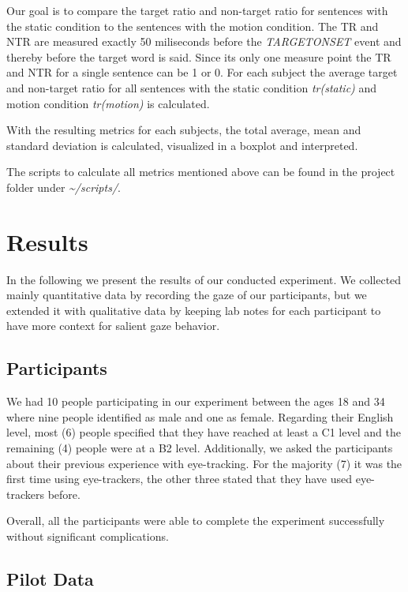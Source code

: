 \documentclass[
  12pt,
  letterpaper,
  DIV=11,
  numbers=noendperiod]{scrreprt}
\begin{document}
Our goal is to compare the target ratio and non-target ratio for
sentences with the static condition to the sentences with the motion
condition. The TR and NTR are measured exactly 50 miliseconds before the
\emph{TARGETONSET} event and thereby before the target word is said.
Since its only one measure point the TR and NTR for a single sentence
can be 1 or 0. For each subject the average target and non-target ratio
for all sentences with the static condition \emph{tr(static)} and motion
condition \emph{tr(motion)} is calculated.

With the resulting metrics for each subjects, the total average, mean
and standard deviation is calculated, visualized in a boxplot and
interpreted.

The scripts to calculate all metrics mentioned above can be found in the
project folder under \emph{\textasciitilde/scripts/}.

\chapter{Results}\label{sec-results}

In the following we present the results of our conducted experiment. We
collected mainly quantitative data by recording the gaze of our
participants, but we extended it with qualitative data by keeping lab
notes for each participant to have more context for salient gaze
behavior.

\section{Participants}\label{participants}

We had 10 people participating in our experiment between the ages 18 and
34 where nine people identified as male and one as female. Regarding
their English level, most (6) people specified that they have reached at
least a C1 level and the remaining (4) people were at a B2 level.
Additionally, we asked the participants about their previous experience
with eye-tracking. For the majority (7) it was the first time using
eye-trackers, the other three stated that they have used eye-trackers
before.

Overall, all the participants were able to complete the experiment
successfully without significant complications.

\section{Pilot Data}\label{pilot-data}
\end{document}
